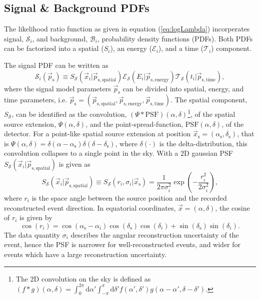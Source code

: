\documentclass{article}
\newcommand{\eq}[1]{(\ref{#1})}
\newcommand{\ps}{\vec{p}_{\mathrm{s}}}
\newcommand{\xs}{\vec{x}_{\mathrm{s}}}
\begin{document}
\subsection{Signal \& Background PDFs}

The likelihood ratio function as given in equation \eq{eq:logLambda}
incorperates signal, $\mathcal{S}_i$, and background, $\mathcal{B}_i$,
probability density functions (PDFs). Both PDFs can be factorized into a
spatial ($S_i$), an energy ($\mathcal{E}_i$), and a time ($\mathcal{T}_i$)
component.

The signal PDF can be written as
\begin{equation}
 \mathcal{S}_i(\ps) \equiv S_{\mathcal{S}}(\vec{x}_i|\vec{p}_{\mathrm{s,spatial}}) \mathcal{E}_{\mathcal{S}}(E_i|\vec{p}_{\mathrm{s,energy}}) \mathcal{T}_{\mathcal{S}}(t_i|\vec{p}_{\mathrm{s,time}}),
 \label{eq:Si}
\end{equation}
where the signal model parameters $\ps$ can be divided into spatial, energy, and
time parameters, i.e. $\vec{p}_{\mathrm{s}} = (\vec{p}_{\mathrm{s,spatial}},
\vec{p}_{\mathrm{s,energy}}, \vec{p}_{\mathrm{s,time}})$. The spatial component,
$S_{\mathcal{S}}$, can be identified as the convolution,
$(\Psi \ast \mathrm{PSF})(\alpha,\delta)$\footnote{The 2D convolution on the sky
is defined as
$(f \ast g)(\alpha,\delta) = \int_{0}^{2\pi} \mathrm{d}\alpha' \int_{-\pi}^{\pi} \mathrm{d}\delta' f(\alpha',\delta')g(\alpha-\alpha',\delta-\delta')$.},
of the spatial source extension, $\Psi(\alpha,\delta)$, and the point-spread-function,
$\mathrm{PSF}(\alpha,\delta)$, of the detector.
For a point-like spatial source extension at position
$\xs = (\alpha_{\mathrm{s}},\delta_{\mathrm{s}})$, that is
$\Psi(\alpha,\delta) = \delta(\alpha-\alpha_{\mathrm{s}})\delta(\delta-\delta_{\mathrm{s}})$,
where $\delta(\cdot)$ is the delta-distribution, this convolution collapses to
a single point in the sky. With a 2D gaussian PSF
$S_{\mathcal{S}}(\vec{x}_i|\vec{p}_{\mathrm{s,spatial}})$ is given as
\begin{equation}
 S_{\mathcal{S}}(\vec{x}_i|\vec{p}_{\mathrm{s,spatial}}) \equiv S_{\mathcal{S}}(r_i,\sigma_i|\xs) = \frac{1}{2\pi\sigma_i^2}\exp\left({-\frac{r_i^2}{2\sigma_i^2}}\right),
\end{equation}
where $r_i$ is the space angle between the source position and the recorded
reconstructed event direction. In equatorial coordinates,
$\vec{x} = (\alpha,\delta)$, the cosine of $r_i$ is given by
\begin{equation}
 \cos(r_i) = \cos(\alpha_{\mathrm{s}} - \alpha_i) \cos(\delta_{\mathrm{s}})\cos({\delta_i}) + \sin(\delta_{\mathrm{s}})\sin(\delta_i).
\end{equation}
The data quantity $\sigma_i$ describes the angular reconstruction uncertainty of
the event, hence the PSF is narrower for well-reconstructed events, and wider
for events which have a large reconstruction uncertainty.
\end{document}
